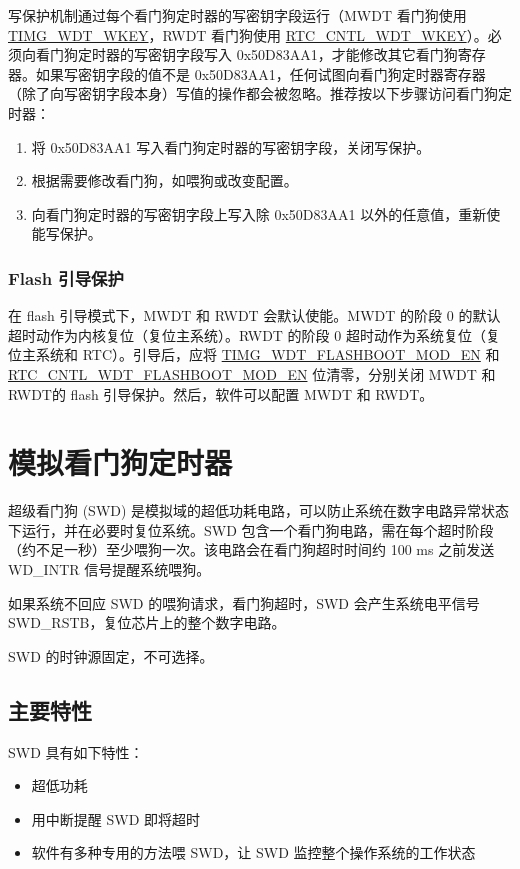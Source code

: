\documentclass[main\_\_CN.tex]{subfiles}
\begin{document}
写保护机制通过每个看门狗定时器的写密钥字段运行（MWDT 看门狗使用 \hyperref[fielddesc:TIMGWDTWKEY]{TIMG\_WDT\_WKEY}，RWDT 看门狗使用 \hyperref[fielddesc:RTCCNTLWDTWKEY]{RTC\_CNTL\_WDT\_WKEY}）。必须向看门狗定时器的写密钥字段写入 0x50D83AA1，才能修改其它看门狗寄存器。如果写密钥字段的值不是 0x50D83AA1，任何试图向看门狗定时器寄存器（除了向写密钥字段本身）写值的操作都会被忽略。推荐按以下步骤访问看门狗定时器：

\begin{enumerate}
\item 将 0x50D83AA1 写入看门狗定时器的写密钥字段，关闭写保护。
\item 根据需要修改看门狗，如喂狗或改变配置。
\item 向看门狗定时器的写密钥字段上写入除 0x50D83AA1 以外的任意值，重新使能写保护。
\end{enumerate}

\subsubsection{Flash 引导保护}
在 flash 引导模式下，MWDT 和 RWDT 会默认使能。MWDT 的阶段 0 的默认超时动作为内核复位（复位主系统）。RWDT 的阶段 0 超时动作为系统复位（复位主系统和 RTC）。引导后，应将 \hyperref[fielddesc:TIMGWDTFLASHBOOTMODEN]{TIMG\_WDT\_FLASHBOOT\_MOD\_EN} 和 \hyperref[fielddesc:RTCCNTLWDTFLASHBOOTMODEN]{RTC\_CNTL\_WDT\_FLASHBOOT\_MOD\_EN} 位清零，分别关闭 MWDT 和 RWDT的 flash 引导保护。然后，软件可以配置 MWDT 和 RWDT。


\section{模拟看门狗定时器}\label{sec:wdt-swdt}
超级看门狗 (SWD) 是模拟域的超低功耗电路，可以防止系统在数字电路异常状态下运行，并在必要时复位系统。SWD 包含一个看门狗电路，需在每个超时阶段（约不足一秒）至少喂狗一次。该电路会在看门狗超时时间约 100 ms 之前发送 WD\_INTR 信号提醒系统喂狗。

如果系统不回应 SWD 的喂狗请求，看门狗超时，SWD 会产生系统电平信号 SWD\_RSTB，复位芯片上的整个数字电路。

SWD 的时钟源固定，不可选择。

\subsection{主要特性}
SWD 具有如下特性：
\begin{itemize}
    \item 超低功耗
    \item 用中断提醒 SWD 即将超时
    \item 软件有多种专用的方法喂 SWD，让 SWD 监控整个操作系统的工作状态
\end{itemize}
\end{document}

